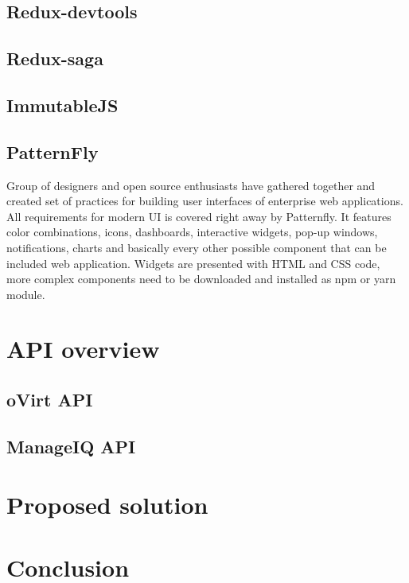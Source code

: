 \section{Redux-devtools}
\section{Redux-saga}
\section{ImmutableJS}
\section{PatternFly}
Group of designers and open source enthusiasts have gathered together and created set of practices for building user interfaces of enterprise web applications. All requirements for modern UI is covered right away by Patternfly. It features color combinations, icons, dashboards, interactive widgets, pop-up windows, notifications, charts and basically every other possible component that can be included web application. Widgets are presented with HTML and CSS code, more complex components need to be downloaded and installed as npm or yarn module.

\chapter{API overview}

\section{oVirt API}
\section{ManageIQ API}




\chapter{Proposed solution}



\chapter{Conclusion}

